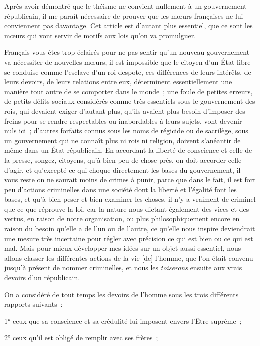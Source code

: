 \documentclass[french,twoside]{book} %
\begin{document}
\noindent Après avoir démontré que le théisme ne convient nullement à un gouvernement républicain, il me paraît nécessaire de prouver que les mœurs françaises ne lui conviennent pas davantage. Cet article est d’autant plus essentiel, que ce sont les mœurs qui vont servir de motifs aux lois qu’on va promulguer.\par
Français vous êtes trop éclairés pour ne pas sentir qu’un nouveau gouvernement va nécessiter de nouvelles mœurs, il est impossible que le citoyen d’un État libre se conduise comme l’esclave d’un roi despote, ces différences de leurs intérêts, de leurs devoirs, de leurs relations entre eux, déterminent essentiellement une manière tout autre de se comporter dans le monde ; une foule de petites erreurs, de petits délits sociaux considérés comme très essentiels sous le gouvernement des rois, qui devaient exiger d’autant plus, qu’ils avaient plus besoin d’imposer des freins pour se rendre respectables ou inabordables à leurs sujets, vont devenir nuls ici ; d’autres forfaits connus sous les noms de régicide ou de sacrilège, sous un gouvernement qui ne connaît plus ni rois ni religion, doivent s’anéantir de même dans un État républicain. En accordant la liberté de conscience et celle de la presse, songez, citoyens, qu’à bien peu de chose près, on doit accorder celle d’agir, et qu’excepté ce qui choque directement les bases du gouvernement, il vous reste on ne saurait moins de crimes à punir, parce que dans le fait, il est fort peu d’actions criminelles dans une société dont la liberté et l’égalité font les bases, et qu’à bien peser et bien examiner les choses, il n’y a vraiment de criminel que ce que réprouve la loi, car la nature nous dictant également des vices et des vertus, en raison de notre organisation, ou plus philosophiquement encore en raison du besoin qu’elle a de l’un ou de l’autre, ce qu’elle nous inspire deviendrait une mesure très incertaine pour régler avec précision ce qui est bien ou ce qui est mal. Mais pour mieux développer mes idées sur un objet aussi essentiel, nous allons classer les différentes actions de la vie [de] l’homme, que l’on était convenu jusqu’à présent de nommer criminelles, et nous les {\itshape toiserons} ensuite aux vrais devoirs d’un républicain.\par
On a considéré de tout temps les devoirs de l’homme sous les trois différents rapports suivants :\par
1° ceux que sa conscience et sa crédulité lui imposent envers l’Être suprême ;\par
2° ceux qu’il est obligé de remplir avec ses frères ;\par
\end{document}
